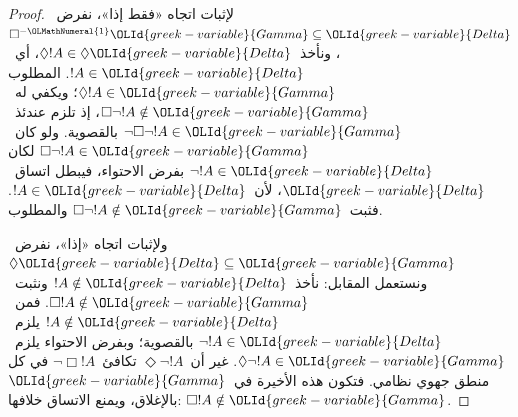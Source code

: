 \documentclass[../../../include/open-logic-section]{subfiles}
\begin{document}
\begin{proof}
  لإثبات اتجاه «فقط إذا»، نفرض~$\Box^{-\OLMathNumeral{1}}\OLId{greek-variable}{Gamma} \subseteq \OLId{greek-variable}{Delta}$،
  ونأخذ~$\Diamond!A \in \Diamond\OLId{greek-variable}{Delta}$، أي~$!A \in \OLId{greek-variable}{Delta}$.
  المطلوب $\Diamond!A \in \OLId{greek-variable}{Gamma}$؛ ويكفي له~$\Box\lnot!A \notin \OLId{greek-variable}{Gamma}$،
  إذ تلزم عندئذ~$\lnot\Box\lnot !A \in \OLId{greek-variable}{Gamma}$ بالقصوية.
  ولو كان~$\Box\lnot!A \in \OLId{greek-variable}{Gamma}$ لكان
  $\lnot!A \in \OLId{greek-variable}{Delta}$ بفرض الاحتواء، فيبطل اتساق~$\OLId{greek-variable}{Delta}$،
  لأن~$!A \in \OLId{greek-variable}{Delta}$. فثبت~$\Box\lnot!A \notin \OLId{greek-variable}{Gamma}$ والمطلوب.

  ولإثبات اتجاه «إذا»، نفرض~$\Diamond\OLId{greek-variable}{Delta} \subseteq \OLId{greek-variable}{Gamma}$
  ونستعمل المقابل: نأخذ~$!A \notin \OLId{greek-variable}{Delta}$ ونثبت~$\Box!A \notin \OLId{greek-variable}{Gamma}$.
  فمن~$!A \notin \OLId{greek-variable}{Delta}$ يلزم~$\lnot!A \in \OLId{greek-variable}{Delta}$ بالقصوية؛
  وبفرض الاحتواء يلزم~$\Diamond\lnot!A \in \OLId{greek-variable}{Gamma}$.
  غير أن~$\Diamond\lnot!A$ تكافئ~$\lnot\Box !A$ في كل منطق جهوي نظامي.
  فتكون هذه الأخيرة في~$\OLId{greek-variable}{Gamma}$ بالإغلاق، ويمنع الاتساق خلافها:
  $\Box!A \notin\OLId{greek-variable}{Gamma}$.
\end{proof}
\end{document}
